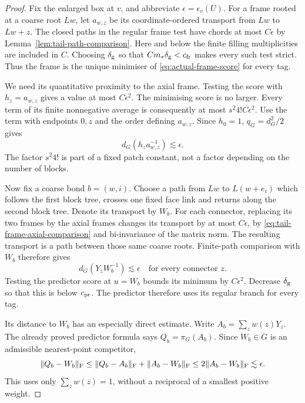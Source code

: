 \documentclass[11pt,reqno]{amsart}
\numberwithin{equation}{section}
\theoremstyle{definition}
\theoremstyle{remark}
\begin{document}
\begin{proof}
Fix the enlarged box at \(v\), and abbreviate
\(\epsilon=\epsilon_v(U)\). For a frame rooted at a coarse
root \(Lw\), let \(a_{w,z}\) be its coordinate-ordered
transport from \(Lw\) to \(Lw+z\). The closed paths in
the regular frame test have chords at most \(C\epsilon\)
by Lemma~\ref{lem:tail-path-comparison}. Here and below
the finite filling multiplicities are included in \(C\).
Choosing \(\delta_{\rm g}\) so that
\(Cm_*\delta_{\rm g}<c_{\rm fr}\) makes every such test
strict. Thus the frame is the unique minimiser of
\eqref{eq:actual-frame-score} for every tag.

We need its quantitative proximity to the axial frame.
Testing the score with \(h_z=a_{w,z}\) gives a value at
most \(C\epsilon^2\). The minimising score is no larger.
Every term of its finite nonnegative average is consequently
at most \(s^2 4! C\epsilon^2\). Use the term with endpoints
\(0,z\) and the order defining \(a_{w,z}\). Since \(h_0=1\),
\(q_G=d_G^2/2\) gives
\begin{equation}
                 d_G(h_z a_{w,z}^{-1})\lesssim\epsilon.
 \label{eq:tail-frame-axial-comparison}
\end{equation}
The factor \(s^2 4!\) is part of a fixed patch constant,
not a factor depending on the number of blocks.

Now fix a coarse bond \(b=(w,i)\). Choose a path from
\(Lw\) to \(L(w+e_i)\) which follows the first block tree,
crosses one fixed face link and returns along the second
block tree. Denote its transport by \(W_b\). For each
connector, replacing its two frames by the axial frames
changes its transport by at most \(C\epsilon\), by
\eqref{eq:tail-frame-axial-comparison} and bi-invariance
of the matrix norm. The resulting transport is a path
between those same coarse roots. Finite-path comparison
with \(W_b\) therefore gives
\begin{equation}
                              d_G(Y_zW_b^{-1})\lesssim\epsilon
                                    \quad\text{for every connector }z.
 \label{eq:tail-connectors-common-path}
\end{equation}
Testing the predictor score at \(u=W_b\) bounds its
minimum by \(C\epsilon^2\). Decrease \(\delta_{\rm g}\)
so that this is below \(c_{\rm pr}\). The predictor
therefore uses its regular branch for every tag.

Its distance to \(W_b\) has an especially direct estimate.
Write \(A_b=\sum_z w(z)Y_z\). The already proved
predictor formula says \(Q_b=\pi_G(A_b)\). Since
\(W_b\in G\) is an admissible nearest-point competitor,
\[
       \|Q_b-W_b\|_{\rm F}
          \le\|Q_b-A_b\|_{\rm F}+\|A_b-W_b\|_{\rm F}
          \le2\|A_b-W_b\|_{\rm F}\lesssim\epsilon.
\]
This uses only \(\sum_z w(z)=1\), without a reciprocal
of a smallest positive weight.


\end{proof}
\end{document}
